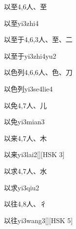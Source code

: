 \begin{entry}{以至}{4,6}{⼈、⾄}
  \begin{phonetics}{以至}{yi3zhi4}
  \end{phonetics}
\end{entry}

\begin{entry}{以至于}{4,6,3}{⼈、⾄、⼆}
  \begin{phonetics}{以至于}{yi3zhi4yu2}
  \end{phonetics}
\end{entry}

\begin{entry}{以色列}{4,6,6}{⼈、⾊、⼑}
  \begin{phonetics}{以色列}{yi3se4lie4}
  \end{phonetics}
\end{entry}

\begin{entry}{以免}{4,7}{⼈、⼉}
  \begin{phonetics}{以免}{yi3mian3}
  \end{phonetics}
\end{entry}

\begin{entry}{以来}{4,7}{⼈、⽊}
  \begin{phonetics}{以来}{yi3lai2}[][HSK 3]
  \end{phonetics}
\end{entry}

\begin{entry}{以求}{4,7}{⼈、⽔}
  \begin{phonetics}{以求}{yi3qiu2}
  \end{phonetics}
\end{entry}

\begin{entry}{以往}{4,8}{⼈、⼻}
  \begin{phonetics}{以往}{yi3wang3}[][HSK 5]
  \end{phonetics}
\end{entry}

